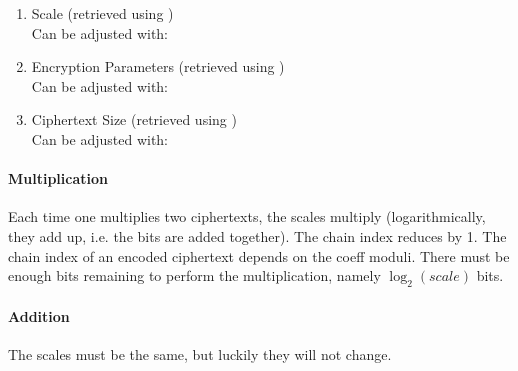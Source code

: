 \begin{enumerate}
  \item Scale (retrieved using ) \\
        Can be adjusted with: 
  \item Encryption Parameters (retrieved using ) \\
        Can be adjusted with: 
  \item Ciphertext Size (retrieved using ) \\
        Can be adjusted with: 
\end{enumerate}


\paragraph{Multiplication}
Each time one multiplies two ciphertexts, the scales multiply (logarithmically, they add up, i.e. the bits are added together).
The chain index reduces by 1. The chain index of an encoded ciphertext depends on the coeff moduli.
There must be enough bits remaining to perform the multiplication, namely $\log_2(scale)$ bits.

\paragraph{Addition}
The scales must be the same, but luckily they will not change.

